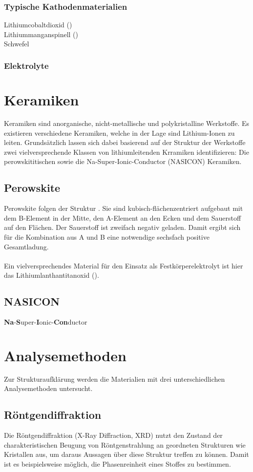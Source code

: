 \documentclass[a4paper, 11pt, headsepline,footsepline,twoside,abstract]{scrbook}
\begin{document}
\subsubsection{Typische Kathodenmaterialien}
\begin{description}
\item[Lithiumcobaltdioxid ()]
\item[Lithiummanganspinell ()]
\item[Schwefel]
\end{description}
\subsubsection{Elektrolyte}
\section{Keramiken}
Keramiken sind anorganische, nicht-metallische und polykristalline Werkstoffe. Es existieren verschiedene Keramiken, welche in der Lage sind Lithium-Ionen zu leiten. Grundsätzlich lassen sich dabei basierend auf der Struktur der Werkstoffe zwei vielversprechende Klassen von lithiumleitenden Krramiken identifizieren: Die perowskititischen sowie die Na-Super-Ionic-Conductor (NASICON) Keramiken. 
\subsection{Perowskite}
Perowskite folgen der Struktur . Sie sind kubisch-flächenzentriert aufgebaut mit dem B-Element in der Mitte, den A-Element an den Ecken und dem Sauerstoff auf den Flächen. Der Sauerstoff ist zweifach negativ geladen. Damit ergibt sich für die Kombination aus A und B eine notwendige sechsfach positive Gesamtladung. %
\\\\
Ein vielversprechendes Material für den Einsatz als Festkörperelektrolyt ist hier das Lithiumlanthantitanoxid ().
\subsection{NASICON}
\textbf{Na}-\textbf{S}uper-\textbf{I}onic-\textbf{Con}ductor
\section{Analysemethoden}
Zur Strukturaufklärung werden die Materialien mit drei unterschiedlichen Analysemethoden untersucht.
\subsection{Röntgendiffraktion}
Die Röntgendiffraktion (X-Ray Diffraction, XRD) nutzt den Zustand der charakteristischen Beugung von Röntgenstrahlung an geordneten Strukturen wie Kristallen aus, um daraus Aussagen über diese Struktur treffen zu können. Damit ist es beispielsweise möglich, die Phasenreinheit eines Stoffes zu bestimmen.
\end{document}
